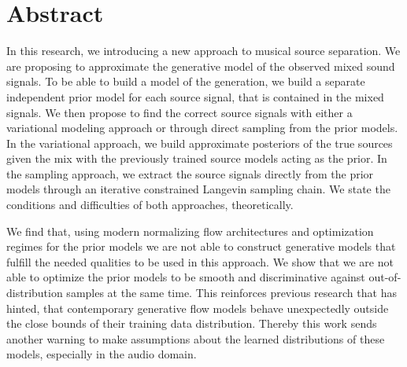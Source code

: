 \chapter{Abstract}%
\label{ch:abstract}%
In this research, we introducing a new approach to musical source separation. We are proposing to approximate the generative model of the observed mixed sound signals. To be able to build a model of the generation, we build a separate independent prior model for each source signal, that is contained in the mixed signals. We then propose to find the correct source signals with either a variational modeling approach or through direct sampling from the prior models. In the variational approach, we build approximate posteriors of the true sources given the mix with the previously trained source models acting as the prior. In the sampling approach, we extract the source signals directly from the prior models through an iterative constrained Langevin sampling chain. We state the conditions and difficulties of both approaches, theoretically.

We find that, using modern normalizing flow architectures and optimization regimes for the prior models we are not able to construct generative models that fulfill the needed qualities to be used in this approach. We show that we are not able to optimize the prior models to be smooth and discriminative against out-of-distribution samples at the same time. This reinforces previous research that has hinted, that contemporary generative flow models behave unexpectedly outside the close bounds of their training data distribution. Thereby this work sends another warning to make assumptions about the learned distributions of these models, especially in the audio domain.
